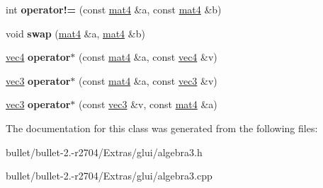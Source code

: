 \begin{DoxyCompactItemize}
\item 
\hypertarget{classmat4_a43bfd79a43b2d40a3afa8f80318325ea}{int {\bfseries operator!=} (const \hyperlink{classmat4}{mat4} \&a, const \hyperlink{classmat4}{mat4} \&b)}\label{classmat4_a43bfd79a43b2d40a3afa8f80318325ea}

\item 
\hypertarget{classmat4_af7bc191797f0f9e2eaf21918bfac24f8}{void {\bfseries swap} (\hyperlink{classmat4}{mat4} \&a, \hyperlink{classmat4}{mat4} \&b)}\label{classmat4_af7bc191797f0f9e2eaf21918bfac24f8}

\item 
\hypertarget{classmat4_a0252c203e5a77099da7fd04c576ed437}{\hyperlink{classvec4}{vec4} {\bfseries operator$\ast$} (const \hyperlink{classmat4}{mat4} \&a, const \hyperlink{classvec4}{vec4} \&v)}\label{classmat4_a0252c203e5a77099da7fd04c576ed437}

\item 
\hypertarget{classmat4_a3a7a7dfc514a58f3c889b48fa4745815}{\hyperlink{classvec3}{vec3} {\bfseries operator$\ast$} (const \hyperlink{classmat4}{mat4} \&a, const \hyperlink{classvec3}{vec3} \&v)}\label{classmat4_a3a7a7dfc514a58f3c889b48fa4745815}

\item 
\hypertarget{classmat4_ac87402f559c51cd778b6012774481c39}{\hyperlink{classvec3}{vec3} {\bfseries operator$\ast$} (const \hyperlink{classvec3}{vec3} \&v, const \hyperlink{classmat4}{mat4} \&a)}\label{classmat4_ac87402f559c51cd778b6012774481c39}

\end{DoxyCompactItemize}


The documentation for this class was generated from the following files\+:\begin{DoxyCompactItemize}
\item 
bullet/bullet-\/2.-\/r2704/\+Extras/glui/algebra3.\+h\item 
bullet/bullet-\/2.-\/r2704/\+Extras/glui/algebra3.\+cpp\end{DoxyCompactItemize}
